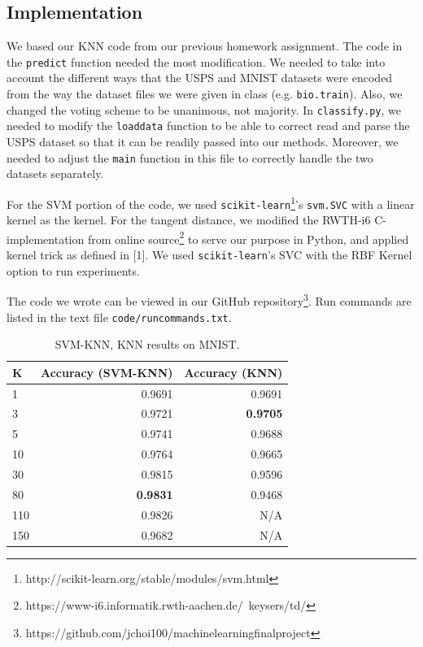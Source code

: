 \documentclass[11pt,letterpaper]{article}
\begin{document}
\subsection{Implementation}

We based our KNN code from our previous homework assignment. The code in the {\tt predict} function needed the most modification. We needed to take into account the different ways that the USPS and MNIST datasets were encoded from the way the dataset files we were given in class (e.g. {\tt bio.train}). Also, we changed the voting scheme to be unanimous, not majority. In {\tt classify.py}, we needed to modify the {\tt load\textunderscore data} function to be able to correct read and parse the USPS dataset so that it can be readily passed into our methods. Moreover, we needed to adjust the {\tt main} function in this file to correctly handle the two datasets separately.


For the SVM portion of the code, we used {\tt scikit-learn}\footnote{http://scikit-learn.org/stable/modules/svm.html}'s {\tt svm.SVC} with a linear kernel as the kernel. For the tangent distance, we modified the RWTH-i6 C-implementation from online source\footnote{https://www-i6.informatik.rwth-aachen.de/~keysers/td/} to serve our purpose in Python, and applied kernel trick as defined in [1]. We used {\tt scikit-learn}'s SVC with the RBF Kernel option to run experiments.


The code we wrote can be viewed in our GitHub repository\footnote{https://github.com/jchoi100/machine\textunderscore learning\textunderscore final\textunderscore project}. Run commands are listed in the text file {\tt code/run\textunderscore commands.txt}.

\begin{table}
\begin{center}
\begin{tabular}{|l|r|r|}
\hline \bf K & \bf Accuracy (SVM-KNN) & \bf Accuracy (KNN)\\ \hline
1 & 0.9691 & 0.9691 \\
3 & 0.9721 & \textbf{0.9705} \\
5 & 0.9741 & 0.9688 \\
10 & 0.9764 & 0.9665 \\
30 & 0.9815 & 0.9596 \\
80 & \textbf{0.9831} & 0.9468 \\
110 & 0.9826& N/A \\
150 & 0.9682 & N/A \\
\hline
\end{tabular}
\end{center}
\caption{\label{svm-knn-mnist} SVM-KNN, KNN results on MNIST. }
\end{table}
\end{document}

